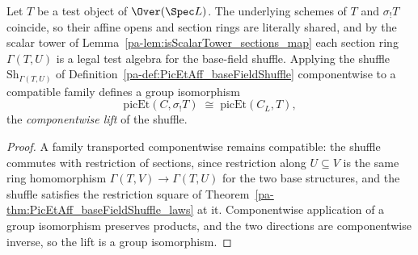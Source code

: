 \begin{definition}
  \label{pa-def:picEtCrossBase}
  \leanok

  Let \(T\) be a test object of \(\Over(\Spec L)\).  The underlying schemes of \(T\)
  and \(\sigma_{!}T\) coincide, so their affine opens and section rings are literally
  shared, and by the scalar tower of
  Lemma~\ref{pa-lem:isScalarTower_sections_map} each section ring \(\Gamma(T, U)\) is a
  legal test algebra for the base-field shuffle.  Applying the shuffle
  \(\mathrm{Sh}_{\Gamma(T,U)}\) of Definition~\ref{pa-def:PicEtAff_baseFieldShuffle}
  componentwise to a compatible family defines a group isomorphism
  \[
    \mathrm{picEt}(C, \sigma_{!}T) \;\cong\; \mathrm{picEt}(C_L, T),
  \]
  the \emph{componentwise lift} of the shuffle.
\end{definition}
\begin{proof}
  \leanok
  A family transported componentwise remains compatible: the shuffle commutes with
  restriction of sections, since restriction along \(U \subseteq V\) is the same ring
  homomorphism \(\Gamma(T, V) \to \Gamma(T, U)\) for the two base structures, and the
  shuffle satisfies the restriction square of
  Theorem~\ref{pa-thm:PicEtAff_baseFieldShuffle_laws} at it.  Componentwise application
  of a group isomorphism preserves products, and the two directions are componentwise
  inverse, so the lift is a group isomorphism.
\end{proof}

